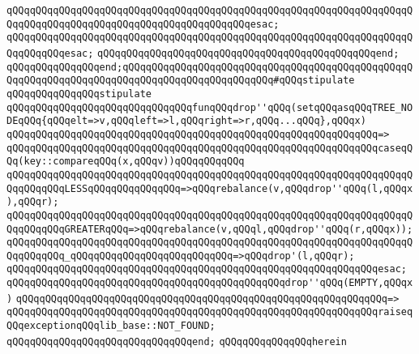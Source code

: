 \verb|qQQqqQQqqQQqqQQqqQQqqQQqqQQqqQQqqQQqqQQqqQQqqQQqqQQqqQQqqQQqqQQqqQQqqQQqqQQqqQQqqQQqqQQqqQQqqQQqqQQqqQQqqQQqqQQqesac;|\newline
\verb|qQQqqQQqqQQqqQQqqQQqqQQqqQQqqQQqqQQqqQQqqQQqqQQqqQQqqQQqqQQqqQQqqQQqqQQqqQQqqQQqesac;|\newline
\verb|qQQqqQQqqQQqqQQqqQQqqQQqqQQqqQQqqQQqqQQqqQQqqQQqend;|\newline
\verb|qQQqqQQqqQQqqQQqend;qQQqqQQqqQQqqQQqqQQqqQQqqQQqqQQqqQQqqQQqqQQqqQQqqQQqqQQqqQQqqQQqqQQqqQQqqQQqqQQqqQQqqQQqqQQqqQQq#qQQqstipulate|\newline
\newline
\newline
\verb|qQQqqQQqqQQqqQQqstipulate|\newline
\verb|qQQqqQQqqQQqqQQqqQQqqQQqqQQqqQQqfunqQQqdrop''qQQq(setqQQqasqQQqTREE_NODEqQQq{qQQqelt=>v,qQQqleft=>l,qQQqright=>r,qQQq...qQQq},qQQqx)|\newline
\verb|qQQqqQQqqQQqqQQqqQQqqQQqqQQqqQQqqQQqqQQqqQQqqQQqqQQqqQQqqQQqqQQq=>|\newline
\verb|qQQqqQQqqQQqqQQqqQQqqQQqqQQqqQQqqQQqqQQqqQQqqQQqqQQqqQQqqQQqqQQqcaseqQQq(key::compareqQQq(x,qQQqv))qQQqqQQqqQQq|\newline
\verb|qQQqqQQqqQQqqQQqqQQqqQQqqQQqqQQqqQQqqQQqqQQqqQQqqQQqqQQqqQQqqQQqqQQqqQQqqQQqqQQqLESSqQQqqQQqqQQqqQQq=>qQQqrebalance(v,qQQqdrop''qQQq(l,qQQqx),qQQqr);|\newline
\verb|qQQqqQQqqQQqqQQqqQQqqQQqqQQqqQQqqQQqqQQqqQQqqQQqqQQqqQQqqQQqqQQqqQQqqQQqqQQqqQQqGREATERqQQq=>qQQqrebalance(v,qQQql,qQQqdrop''qQQq(r,qQQqx));|\newline
\verb|qQQqqQQqqQQqqQQqqQQqqQQqqQQqqQQqqQQqqQQqqQQqqQQqqQQqqQQqqQQqqQQqqQQqqQQqqQQqqQQq_qQQqqQQqqQQqqQQqqQQqqQQqqQQq=>qQQqdrop'(l,qQQqr);|\newline
\verb|qQQqqQQqqQQqqQQqqQQqqQQqqQQqqQQqqQQqqQQqqQQqqQQqqQQqqQQqqQQqqQQqesac;|\newline
\newline
\verb|qQQqqQQqqQQqqQQqqQQqqQQqqQQqqQQqqQQqqQQqqQQqqQQqdrop''qQQq(EMPTY,qQQqx)|\newline
\verb|qQQqqQQqqQQqqQQqqQQqqQQqqQQqqQQqqQQqqQQqqQQqqQQqqQQqqQQqqQQqqQQq=>|\newline
\verb|qQQqqQQqqQQqqQQqqQQqqQQqqQQqqQQqqQQqqQQqqQQqqQQqqQQqqQQqqQQqqQQqraiseqQQqexceptionqQQqlib_base::NOT_FOUND;|\newline
\verb|qQQqqQQqqQQqqQQqqQQqqQQqqQQqqQQqend;|\newline
\verb|qQQqqQQqqQQqqQQqherein|\newline
